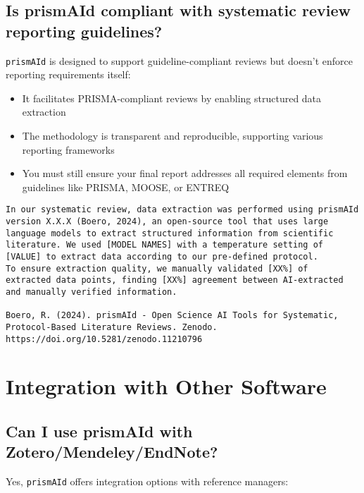 \subsection{Is prismAId compliant with systematic review reporting guidelines?}

\texttt{prismAId} is designed to support guideline-compliant reviews but doesn't enforce reporting requirements itself:

\begin{itemize}
    \item It facilitates PRISMA-compliant reviews by enabling structured data extraction
    \item The methodology is transparent and reproducible, supporting various reporting frameworks
    \item You must still ensure your final report addresses all required elements from guidelines like PRISMA, MOOSE, or ENTREQ
\end{itemize}

\begin{commandbox}
\begin{lstlisting}
In our systematic review, data extraction was performed using prismAId
version X.X.X (Boero, 2024), an open-source tool that uses large
language models to extract structured information from scientific
literature. We used [MODEL NAMES] with a temperature setting of
[VALUE] to extract data according to our pre-defined protocol.
To ensure extraction quality, we manually validated [XX%] of
extracted data points, finding [XX%] agreement between AI-extracted
and manually verified information.

Boero, R. (2024). prismAId - Open Science AI Tools for Systematic,
Protocol-Based Literature Reviews. Zenodo.
https://doi.org/10.5281/zenodo.11210796
\end{lstlisting}
\end{commandbox}

\section{Integration with Other Software}

\subsection{Can I use prismAId with Zotero/Mendeley/EndNote?}

Yes, \texttt{prismAId} offers integration options with reference managers:

